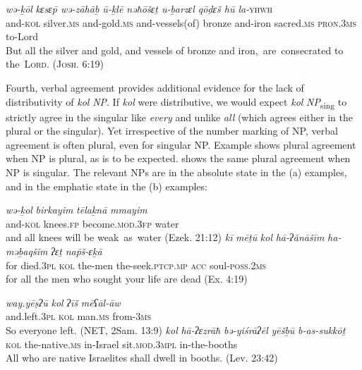 \documentclass[output=paper]{langsci/langscibook}
\begin{document}
\ea%
    \label{ex:doron:18}
    \gll \textit{wə-ḵōl}     \textit{kɛsɛ\={p}        wə-zāhāḇ       ū{}-ḵlē                 nəħōšɛṯ  u-ḇarzɛl   qōḏɛš        hū            la-}\textsc{yhwh}\\
         and-\textsc{kol} silver.\textsc{ms} and-gold.\textsc{ms}  and-vessels(of)  bronze   and-iron  sacred.\textsc{ms}  \textsc{pron.3ms}  to-Lord\\
    \glt But all the silver and gold, and vessels of bronze and iron,{~}are{~}consecrated to the{~}\textsc{\textsc{L}ord. (Josh. 6:19)}
    \z

Fourth, verbal agreement provides additional evidence for the lack of distributivity of \textit{kol} \textit{NP}. If \textit{kol} were distributive, we would expect \textit{kol} \textit{NP}\textsubscript{sing} to strictly agree in the singular like \textit{every} and unlike \textit{all} (which agrees either in the plural or the singular). Yet irrespective of the number marking of NP, verbal agreement is often plural, even for singular NP. Example  shows plural agreement when NP is plural, as is to be expected.  shows the same plural agreement when NP is singular. The relevant NPs are in the absolute state in the (a) examples, and in the emphatic state in the (b) examples:

\ea%
    \label{ex:doron:19}
    \ea
    \gll \textit{wə-ḵol}     \textit{birkayim}   \textit{tēlaḵnā}                  \textit{mmayim}\\
         and-\textsc{kol}  knees.\textsc{fp}   become\textsc{.mod.3fp}   water\\
    \glt and all knees will be weak~as~water (Ezek. 21:12)
    \ex
    \gll \textit{kī}   \textit{mēṯū}        \textit{kol}    \textit{hā-ʔănāšīm}   \textit{ha-məḇaqšīm}         \textit{ʔɛṯ}    \textit{na\={p}š-ɛḵā}\\
         for died.\textsc{3pl}   \textsc{kol}  the-men        the-seek.\textsc{ptcp.mp}  \textsc{acc}  soul-\textsc{poss.2ms}\\
    \glt for all the men who sought your life are dead (Ex. 4:19)
    \z
\z


\ea%
    \label{ex:doron:20}
    \ea
    \gll \textit{way.yēṣʔū}      \textit{kol}   \textit{ʔīš}            \textit{mēʕāl-āw}\\
         and.left\textsc{.3pl}   \textsc{kol}  man.\textsc{ms}  from-\textsc{3ms}\\
    \glt So everyone left. (NET, 2Sam. 13:9)
    \ex
    \gll \textit{kol}    \textit{hā-ʔɛzrāħ}         \textit{bə-yiśrāʔēl}  \textit{yēšḇū}                \textit{b-as-sukkōṯ}\\
         \textsc{kol}  the-native\textsc{.ms}  in-Israel       sit.\textsc{mod.3mpl}  in-the-booths\\
    \glt All who are native Israelites shall dwell in booths. (Lev. 23:42)
    \z
\z
\end{document}
